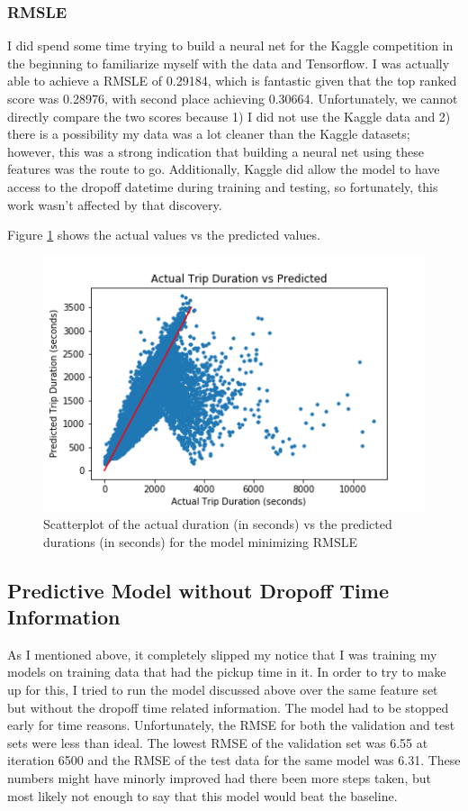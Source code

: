 \documentclass[conference]{IEEEtran}
\begin{document}
\subsubsection{RMSLE}
I did spend some time trying to build a neural net for the Kaggle competition in the beginning to familiarize myself with the data and Tensorflow.  I was actually able to achieve a RMSLE of 0.29184, which is fantastic given that the top ranked score was 0.28976, with second place achieving 0.30664.  Unfortunately, we cannot directly compare the two scores because 1) I did not use the Kaggle data and 2) there is a possibility my data was a lot cleaner than the Kaggle datasets; however, this was a strong indication that building a neural net using these features was the route to go.  Additionally, Kaggle did allow the model to have access to the dropoff datetime during training and testing, so fortunately, this work wasn't affected by that discovery.

Figure \ref{predActRMSLE} shows the actual values vs the predicted values.

 \begin{figure}
  \centering
    \includegraphics[width=\linewidth]{actualVsPredictedRMSLE.png}
      \caption{Scatterplot of the actual duration (in seconds) vs the predicted durations (in seconds) for the model minimizing RMSLE}
      \label{predActRMSLE}
\end{figure}



\subsection{Predictive Model without Dropoff Time Information}
As I mentioned above, it completely slipped my notice that I was training my models on training data that had the pickup time in it.  In order to try to make up for this, I tried to run the model discussed above over the same feature set but without the dropoff time related information.  The model had to be stopped early for time reasons.  Unfortunately, the RMSE for both the validation and test sets were less than ideal.  The lowest RMSE of the validation set was 6.55 at iteration 6500 and the RMSE of the test data for the same model was 6.31.  These numbers might have minorly improved had there been more steps taken, but most likely not enough to say that this model would beat the baseline.
\end{document}
